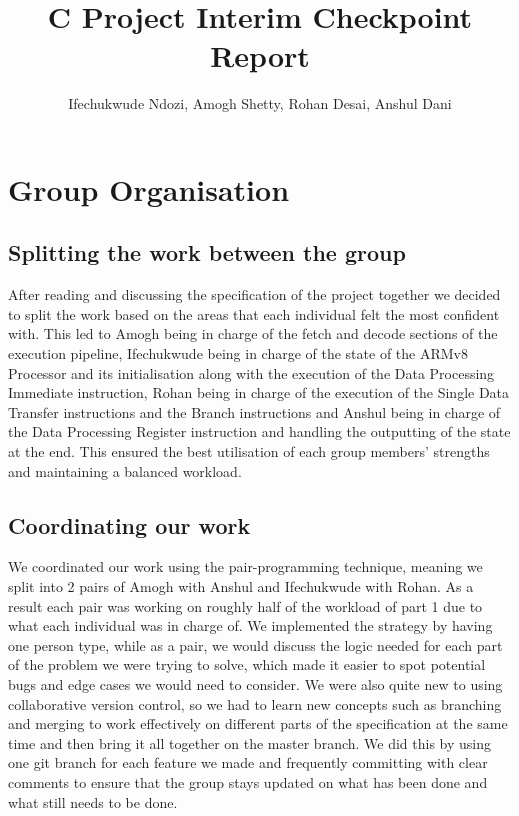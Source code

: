 \documentclass[11pt]{article}
\begin{document}
\title{C Project Interim Checkpoint Report}
\author{Ifechukwude Ndozi, Amogh Shetty, Rohan Desai, Anshul Dani}

\maketitle
\setlength{\parindent}{1cm}

\section{Group Organisation}


\subsection{Splitting the work between the group}

After reading and discussing the specification of the project together we decided to split the work based on the areas that each individual felt the most confident with. This led to Amogh being in charge of the fetch and decode sections of the execution pipeline, Ifechukwude being in charge of the state of the ARMv8 Processor and its initialisation along with the execution of the Data Processing Immediate instruction, Rohan being in charge of the execution of the Single Data Transfer instructions and the Branch instructions and Anshul being in charge of the Data Processing Register instruction and handling the outputting of the state at the end. This ensured the best utilisation of each group members' strengths and maintaining a balanced workload. 

\subsection{Coordinating our work}

We coordinated our work using the pair-programming technique, meaning we split into 2 pairs of Amogh with Anshul and Ifechukwude with Rohan. As a result each pair was working on roughly half of the workload of part 1 due to what each individual was in charge of. We implemented the strategy by having one person type, while as a pair, we would discuss the logic needed for each part of the problem we were trying to solve, which made it easier to spot potential bugs and edge cases we would need to consider. We were also quite new to using collaborative version control, so we had to learn new concepts such as branching and merging to work effectively on different parts of the specification at the same time and then bring it all together on the master branch. We did this by using one git branch for each feature we made and frequently committing with clear comments to ensure that the group stays updated on what has been done and what still needs to be done.
\end{document}
